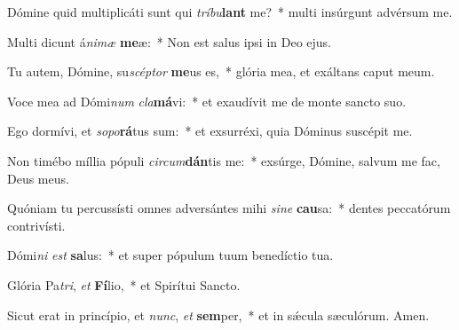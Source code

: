 \item Dómine quid multiplicáti sunt qui \textit{trí}\textit{bu}\textbf{lant} me?~* multi insúrgunt advérsum me.

\item Multi dicunt á\textit{ni}\textit{mæ} \textbf{me}æ:~* Non est salus ipsi in Deo ejus.

\item Tu autem, Dómine, su\textit{scép}\textit{tor} \textbf{me}us es,~* glória mea, et exáltans caput meum.

\item Voce mea ad Dómi\textit{num} \textit{cla}\textbf{má}vi:~* et exaudívit me de monte sancto suo.

\item Ego dormívi, et \textit{so}\textit{po}\textbf{rá}tus sum:~* et exsurréxi, quia Dóminus suscépit me.

\item Non timébo míllia pópuli \textit{cir}\textit{cum}\textbf{dán}tis me:~* exsúrge, Dómine, salvum me fac, Deus meus.

\item Quóniam tu percussísti omnes adversántes mihi \textit{si}\textit{ne} \textbf{cau}sa:~* dentes peccatórum contrivísti.

\item Dómi\textit{ni} \textit{est} \textbf{sa}lus:~* et super pópulum tuum benedíctio tua.

\item Glória Pa\textit{tri}, \textit{et} \textbf{Fí}lio,~* et Spirítui Sancto.

\item Sicut erat in princípio, et \textit{nunc}, \textit{et} \textbf{sem}per,~* et in sǽcula sæculórum. Amen.